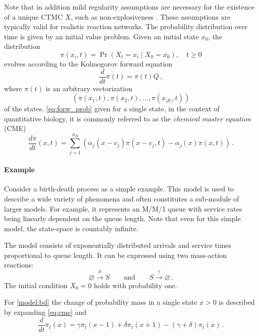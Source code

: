 Note that in addition mild regularity assumptions
are   necessary for the existence of a unique \ac{CTMC} $X$, such as non-explosiveness \cite{anderson2012continuous}.
These assumptions  are  typically
valid for realistic reaction networks.
The probability distribution over time is given by an
initial value problem.
Given an initial state $x_0$, the distribution
\begin{equation}\label{eq:forw_prob}
\pi(x_i, t)=\Pr(X_t=x_i\mid X_0=x_0),\quad t\geq 0
\end{equation}
evolves according to the Kolmogorov forward equation
\begin{equation}\label{eq:forward}
\frac{d}{dt}\pi(t) = \pi(t) Q\,,
\end{equation}
where $\pi(t)$ is an arbitrary vectorization $$(\pi(x_1,t), \pi(x_2,t),\dots,\pi(x_{|\mathcal{S}|},t))$$ of the states.
\eqref{eq:forw_prob} given for a single state, in the context of quantitative biology, it is commonly referred to
as the \emph{chemical master equation} (CME)
\begin{equation}\label{eq:cme}
    \frac{d\pi}{d t} ( x,t) =
    \sum_{j=1}^{n_R}\left(
        \alpha_j( x- v_j)\pi( x- v_j,t) - \alpha_j( x)\pi( x,t)
    \right)\,.
\end{equation}

\paragraph{Example} Consider a birth-death process as a simple example. This model is used to describe a wide variety of phenomena and often constitutes a sub-module of larger models.
For example, it represents an M/M/1 queue with service rates being linearly dependent on the queue length.
Note that even for this simple model, the state-space is countably infinite.
\begin{model}\label{model:bd}
The model consists of exponentially distributed arrivals and service times proportional to queue length. It can be expressed using two mass-action reactions:
$$ \varnothing \xrightarrow{\mu} S \qquad\text{and}\qquad S \xrightarrow{\gamma} \varnothing\,.$$
The initial condition $X_0=0$ holds with probability one.
\end{model}

For \autoref{model:bd} the change of probability mass in a single state $x>0$ is described by expanding
\eqref{eq:cme} and
$$\frac{d}{dt}\pi_t(x)=\gamma \pi_t(x-1) + \delta \pi_t(x+1) - (\gamma + \delta)\pi_t(x)\,.$$


